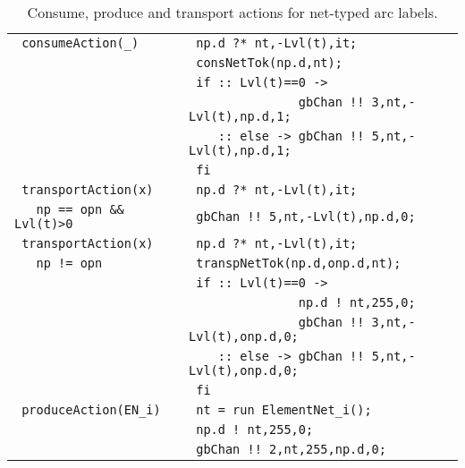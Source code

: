 \documentclass{llncs}
\begin{document}
\small
\begin{table}[h!]
\begin{center}\begin{tabular}{|l|l|}
      \hline
      \verb" consumeAction(_)" & \verb" np.d ?* nt,-Lvl(t),it; "    \\
                               & \verb" consNetTok(np.d,nt);"          \\
                               & \verb" if :: Lvl(t)==0 -> " \\
                               & \verb"               gbChan !! 3,nt,-Lvl(t),np.d,1; " \\
                               & \verb"    :: else -> gbChan !! 5,nt,-Lvl(t),np.d,1; "  \\
                               & \verb" fi"                   \\
      \hline
      \verb" transportAction(x) "        & \verb" np.d ?* nt,-Lvl(t),it;"\\
      \verb"   np == opn && Lvl(t)>0  "  & \verb" gbChan !! 5,nt,-Lvl(t),np.d,0;"   \\
      \hline
      \verb" transportAction(x)" & \verb" np.d ?* nt,-Lvl(t),it;"\\
      \verb"   np != opn "         & \verb" transpNetTok(np.d,onp.d,nt);" \\
                                 & \verb" if :: Lvl(t)==0 -> " \\
                                 & \verb"               np.d ! nt,255,0;  " \\
                                 & \verb"               gbChan !! 3,nt,-Lvl(t),onp.d,0; " \\
                                 & \verb"    :: else -> gbChan !! 5,nt,-Lvl(t),onp.d,0; " \\
                                 & \verb" fi"                   \\
      \hline
      \verb" produceAction(EN_i)" & \verb" nt = run ElementNet_i();"\\
                                  & \verb" np.d ! nt,255,0; "\\
                                  & \verb" gbChan !! 2,nt,255,np.d,0; "\\
      \hline
\end{tabular}\end{center}
\vspace{-2pt}
\caption{Consume, produce and transport actions for net-typed arc labels.}
\label{tab.act.net.places.wo.p}
\end{table}
\normalsize
\end{document}
